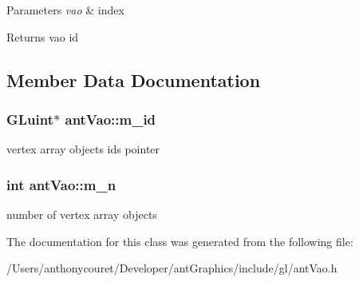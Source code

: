 \begin{DoxyParams}{Parameters}
{\em vao} & index \\
\hline
\end{DoxyParams}
\begin{DoxyReturn}{Returns}
vao id 
\end{DoxyReturn}


\subsection{Member Data Documentation}
\hypertarget{classant_vao_a9ddb4ce72bd223c7da3b826eb7ab4e01}{
\subsubsection[{m\+\_\+id}]{\setlength{\rightskip}{0pt plus 5cm}G\+Luint$\ast$ ant\+Vao\+::m\+\_\+id\hspace{0.3cm}{\ttfamily [private]}}}\label{classant_vao_a9ddb4ce72bd223c7da3b826eb7ab4e01}
vertex array objects ids pointer \hypertarget{classant_vao_a18263ffbcdd4251a7789d5049023d8f8}{
\subsubsection[{m\+\_\+n}]{\setlength{\rightskip}{0pt plus 5cm}int ant\+Vao\+::m\+\_\+n\hspace{0.3cm}{\ttfamily [private]}}}\label{classant_vao_a18263ffbcdd4251a7789d5049023d8f8}
number of vertex array objects 

The documentation for this class was generated from the following file\+:\begin{DoxyCompactItemize}
\item 
/\+Users/anthonycouret/\+Developer/ant\+Graphics/include/gl/ant\+Vao.\+h\end{DoxyCompactItemize}
